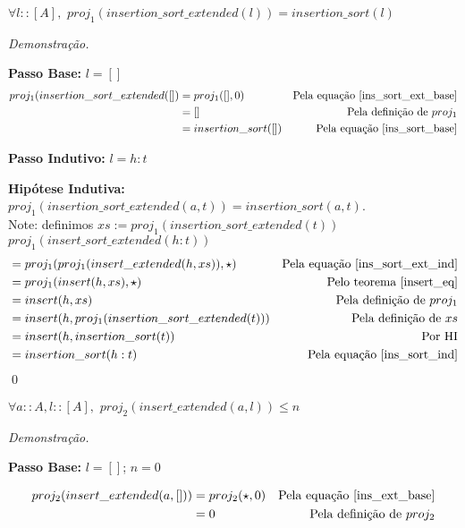 \documentclass[12pt, oneside, a4paper,english,brazil]{abntex2}
\begin{document}
\begin{teorema}
  $\forall l :: [A], \,\, proj_{1}(insertion\_sort\_extended(l)) = insertion\_sort(l)$
\end{teorema}

\noindent \textit{Demonstra\c{c}\~ao.}

\textbf{Passo Base: } $l = []$
\begin{align*}
  proj_{1}(insertion\_sort\_extended([])  &= proj_{1}([], 0) &\text{Pela equa\c{c}\~ao \ref{ins_sort_ext_base}} \\
                                                               &= [] &\text{Pela defini\c{c}\~ao de } proj_1 \\
  &= insertion\_sort([]) &\text{Pela equa\c{c}\~ao \ref{ins_sort_base}}
\end{align*}


\textbf{Passo Indutivo: } $l = h : t$

\textbf{Hip\'otese Indutiva: } $proj_{1}(insertion\_sort\_extended(a, t)) = insertion\_sort(a, t)$.\\

Note: definimos $xs := proj_{1}(insertion\_sort\_extended(t))$\\

$proj_{1}(insert\_sort\_extended(h : t))$
\begin{align*}
  &= proj_{1}(proj_{1}(insert\_extended(h, xs)), \star) &\text{Pela equa\c{c}\~ao \ref{ins_sort_ext_ind}} \\
                                          &= proj_{1}(insert(h, xs), \star) &\text{Pelo teorema \ref{insert_eq}} \\
  &= insert(h, xs) &\text{Pela defini\c{c}\~ao de } proj_1 \\
  &= insert(h, proj_{1}(insertion\_sort\_extended(t))) &\text{Pela defini\c{c}\~ao de $xs$}\\
  &= insert(h, insertion\_sort(t)) &\text{Por HI} \\
  &= insertion\_sort(h : t) &\text{Pela equa\c{c}\~ao \ref{ins_sort_ind}}
\end{align*}
\qed


\begin{teorema} \label{count_ins}
  $\forall a :: A, l :: [A], \,\, proj_{2}(insert\_extended(a, l)) \le n$
\end{teorema}

\noindent \textit{Demonstra\c{c}\~ao.}

\textbf{Passo Base: } $l = []$; $n = 0$

\begin{align*}
  proj_{2}(insert\_extended(a, [])) &= proj_{2}(\star, 0) &\text{Pela equa\c{c}\~ao \ref{ins_ext_base}} \\
  &= 0 &\text{Pela defini\c{c}\~ao de } proj_{2}
\end{align*}
\end{document}
